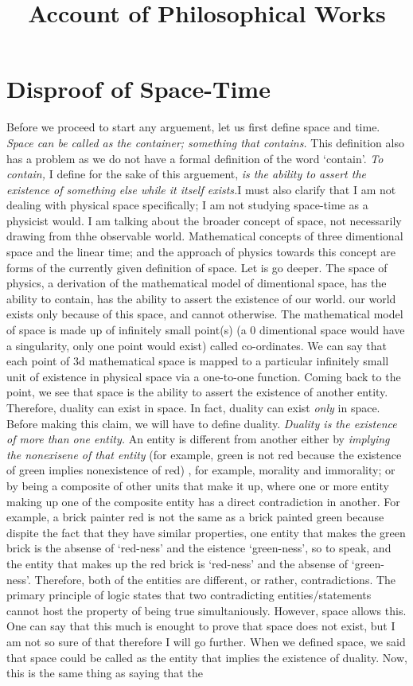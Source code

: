 \documentclass{article}
\title{Account of Philosophical Works}
\newcommand{\tit}[1]{\textit{#1}}
\begin{document}
\maketitle
\newpage
\section{Disproof of Space-Time}
Before we proceed to start any arguement, let us first define space and time. \tit{Space can be called as the container; something that contains.} This definition also has a problem as we do not have a formal definition of the word `contain'. \tit{To contain,} I define for the sake of this arguement, \tit{is the ability to assert the existence of something else while it itself exists.}I must also clarify that I am not dealing with physical space specifically; I am not studying space-time as a physicist would. I am talking about the broader concept of space, not necessarily drawing from thhe observable world. Mathematical concepts of three dimentional space and the linear time; and the approach of physics towards this concept are forms of the currently given definition of space. Let is go deeper. The space of physics, a derivation of the mathematical model of dimentional space, has the ability to contain, has the ability to assert the existence of our world. our world exists only because of this space, and cannot otherwise. The mathematical model of space is made up of infinitely small point(s) (a 0 dimentional space would have a singularity, only one point would exist) called co-ordinates. We can say that each point of 3d mathematical space is mapped to a particular infinitely small unit of existence in physical space via a one-to-one function. Coming back to the point, we see that space is the ability to assert the existence of another entity. Therefore, duality can exist in space. In fact, duality can exist \tit{only} in space. Before making this claim, we will have to define duality. \tit{Duality is the existence of more than one entity.} An entity is different from another either by \tit{implying the nonexisene of that entity} (for example, green is not red because the existence of green implies nonexistence of red) , for example, morality and immorality; or by being a composite of other units that make it up, where one or more entity making up one of the composite entity has a direct contradiction in another. For example, a brick painter red is not the same as a brick painted green because dispite the fact that they have similar properties, one entity that makes the green brick is the absense of `red-ness' and the eistence `green-ness', so to speak, and the entity that makes up the red brick is `red-ness' and the absense of `green-ness'. Therefore, both of the entities are different, or rather, contradictions. The primary principle of logic states that two contradicting entities/statements cannot host the property of being true simultaniously. However, space allows this. One can say that this much is enought to prove that space does not exist, but I am not so sure of that therefore I will go further. When we defined space, we said that space could be called as the entity that implies the existence of duality. Now, this is the same thing as saying that the 
\end{document}
